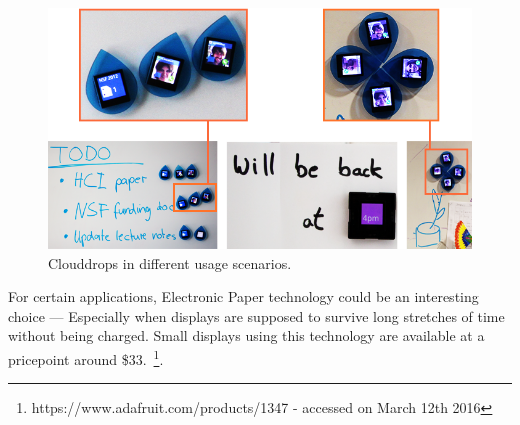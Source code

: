 \begin{figure}[ht]
\centering
	\includegraphics[keepaspectratio, width=6in]{Figures/clouddrops.png}
	\caption{Clouddrops in different usage scenarios.\protect\footnotemark}
	\label{fig:clouddrops}
\end{figure}


For certain applications, Electronic Paper technology could be an interesting choice --- Especially when displays are supposed to survive long stretches of time without being charged. Small displays using this technology are available at a pricepoint around \$33.~\protect\footnote{https://www.adafruit.com/products/1347 - accessed on March 12th 2016}.

\clearpage{}